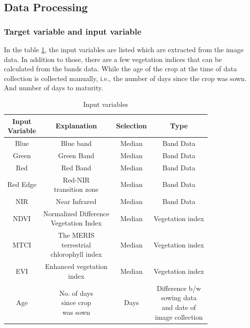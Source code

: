 \documentclass[sigconf, nonacm, natbib, screen, balance=False]{acmart}
\begin{document}
\subsection{Data Processing}\label{sec:aspect1}
\subsubsection{Target variable and input variable}\label{sec:aspect1}

In the table \ref{tab:bands_detail}, the input variables are listed which are extracted from the image data. In addition to those, there are a few vegetation indices that can be calculated from the bands data. While the age of the crop at the time of data collection is collected manually, i.e., the number of days since the crop was sown. And number of days to maturity.

\begin{table}[h!]

  \caption{Input variables}
  \label{tab:bands_detail}
  \begin{tabular}{|c|c|c|c|}
    \hline
	\makecell{Input\\Variable} & Explanation & Selection & Type \\ \hline
	Blue & Blue band & Median & Band Data  \\ 
	\hline
	Green & Green Band & Median & Band Data \\ 
	\hline
	Red & Red Band & Median & Band Data \\ 
	\hline
	Red Edge & \makecell{Red-NIR\\transition zone}  & Median & Band Data \\ 
	\hline
	NIR & Near Infrared & Median & Band Data \\ 
	\hline
	NDVI & \makecell{Normalized Difference\\Vegetation Index} & Median & Vegetation index \\ 
	\hline
	MTCI & \makecell{The MERIS\\terrestrial \\chlorophyll index} & Median & Vegetation index \\ 
	\hline
	EVI & \makecell{Enhanced vegetation\\index} & Median & Vegetation index \\
	\hline
	Age & \makecell{No. of days\\since crop\\was sown} & Days & \makecell{Difference b/w\\sowing data\\and date of\\image collection} \\
	\hline
  \end{tabular}
\end{table}
\end{document}
